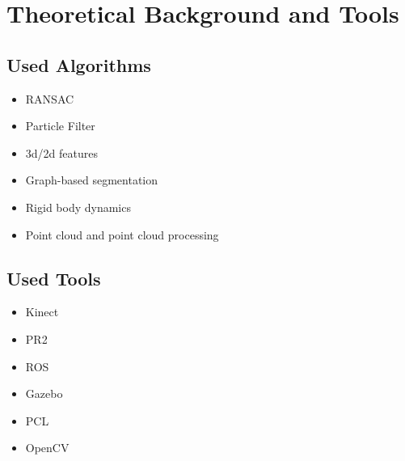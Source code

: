 \chapter{Theoretical Background and Tools}
\label{chapter:Background}

\section{Used Algorithms}
\begin{itemize}
\item RANSAC
\item Particle Filter
\item 3d/2d features
\item Graph-based segmentation
\item Rigid body dynamics
\item Point cloud and point cloud processing
\end{itemize}


\section{Used Tools}
\begin{itemize}
\item Kinect
\item PR2
\item ROS
\item Gazebo
\item PCL
\item OpenCV
\end{itemize}






